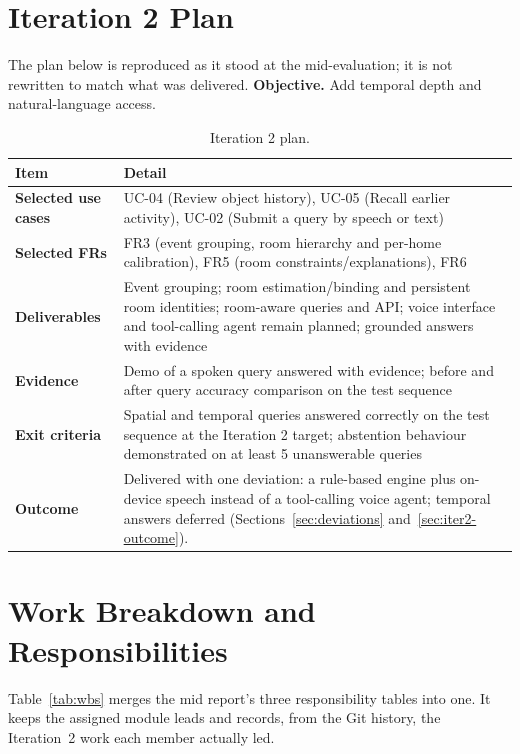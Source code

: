 \section{Iteration 2 Plan}
The plan below is reproduced as it stood at the mid-evaluation; it is not rewritten
to match what was delivered.
\textbf{Objective.} Add temporal depth and natural-language access.

\begin{table}[H]
\centering\small
\caption{Iteration 2 plan.}
\label{tab:iter2}
\begin{tabularx}{\textwidth}{@{}>{\bfseries}L{3cm}Y@{}}
\toprule
{}\textbf{Item} & \textbf{Detail}\\
\midrule
Selected use cases & UC-04 (Review object history), UC-05 (Recall earlier
activity), UC-02 (Submit a query by speech or text)\\
Selected FRs & FR3 (event grouping, room hierarchy and per-home calibration), FR5 (room constraints/explanations), FR6\\
Deliverables & Event grouping; room estimation/binding and persistent room identities; room-aware queries and API; voice
interface and tool-calling agent remain planned; grounded answers with evidence\\
Evidence & Demo of a spoken query answered with evidence; before and after
query accuracy comparison on the test sequence\\
Exit criteria & Spatial and temporal queries answered correctly on the test
sequence at the Iteration 2 target; abstention behaviour demonstrated on at
least 5 unanswerable queries\\
Outcome & Delivered with one deviation: a rule-based engine plus on-device speech instead of a tool-calling voice agent; temporal answers deferred (Sections~\ref{sec:deviations} and~\ref{sec:iter2-outcome}).\\
\bottomrule
\end{tabularx}
\end{table}

\section{Work Breakdown and Responsibilities}
\label{sec:responsibilities}
\label{sec:wbs}
Table~\ref{tab:wbs} merges the mid report's three responsibility tables into
one. It keeps the assigned module leads and records, from the Git history, the
Iteration~2 work each member actually led.

